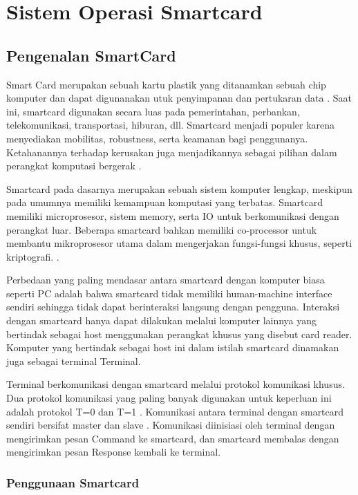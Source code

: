 \documentclass[a4paper, 12pt]{report}
\begin{document}
\chapter{Sistem Operasi Smartcard}
\label{chap_introduction}

\section{Pengenalan SmartCard}

Smart Card merupakan sebuah kartu plastik yang ditanamkan sebuah chip komputer dan dapat digunanakan utuk penyimpanan dan pertukaran data \cite{SCManagement:mohandes}. Saat ini, smartcard digunakan secara luas pada pemerintahan, perbankan, telekomunikasi, transportasi, hiburan, dll. Smartcard menjadi populer karena menyediakan mobilitas, robustness, serta keamanan bagi penggunanya. Ketahanannya terhadap kerusakan juga menjadikannya sebagai pilihan dalam perangkat komputasi bergerak \cite{SCOSPastPresentFuture:deville}.

Smartcard pada dasarnya merupakan sebuah sistem komputer lengkap, meskipun pada umumnya memiliki kemampuan komputasi yang terbatas. Smartcard memiliki microprosesor, sistem memory, serta IO untuk berkomunikasi dengan perangkat luar. Beberapa smartcard bahkan memiliki co-processor untuk membantu mikroprosesor utama dalam mengerjakan fungsi-fungsi khusus, seperti kriptografi. \cite{SCHandbook}. 

Perbedaan yang paling mendasar antara smartcard dengan komputer biasa seperti PC adalah bahwa smartcard tidak memiliki human-machine interface sendiri sehingga tidak dapat berinteraksi langsung dengan pengguna. Interaksi dengan smartcard hanya dapat dilakukan melalui komputer lainnya yang bertindak sebagai host menggunakan perangkat khusus yang disebut card reader. Komputer yang bertindak sebagai host ini dalam istilah smartcard dinamakan juga sebagai terminal Terminal.

Terminal berkomunikasi dengan smartcard melalui protokol komunikasi khusus. Dua protokol komunikasi yang paling banyak digunakan untuk keperluan ini adalah protokol T=0 dan T=1 \cite{SWHWIssue:selimis}. Komunikasi antara terminal dengan smartcard sendiri bersifat master dan slave \cite{SCOS:yuqiang}. Komunikasi diinisiasi oleh terminal dengan mengirimkan pesan Command ke smartcard, dan smartcard membalas dengan mengirimkan pesan Response kembali ke terminal.

\subsection{Penggunaan Smartcard}
\end{document}
